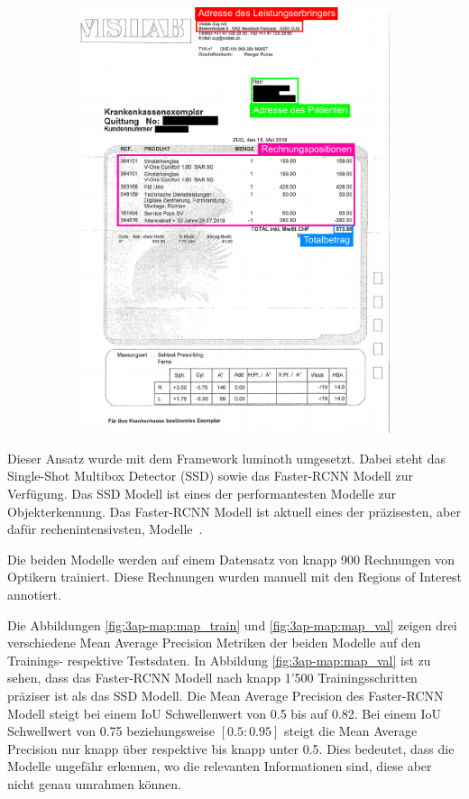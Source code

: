 \begin{figure}[H]
\begin{subfigure}[t]{0.5\linewidth}
    \includegraphics[scale=1]{graphics/roi-example-scan.pdf}
    \vspace{2ex}
  \end{subfigure}
\end{figure}

Dieser Ansatz wurde mit dem Framework luminoth umgesetzt. Dabei steht das Single-Shot Multibox Detector (SSD) sowie das Faster-RCNN Modell zur Verfügung. Das SSD Modell ist eines der performantesten Modelle zur Objekterkennung. Das Faster-RCNN Modell ist aktuell eines der präzisesten, aber dafür rechenintensivsten, Modelle~\autocite{SSDFRCNN}.

Die beiden Modelle werden auf einem Datensatz von knapp 900 Rechnungen von Optikern trainiert. Diese Rechnungen wurden manuell mit den Regions of Interest annotiert.

Die Abbildungen \ref{fig:3ap-map:map_train} und \ref{fig:3ap-map:map_val} zeigen drei verschiedene Mean Average Precision Metriken der beiden Modelle auf den Trainings- respektive Testsdaten. In Abbildung \ref{fig:3ap-map:map_val} ist zu sehen, dass das Faster-RCNN Modell nach knapp 1'500 Trainingsschritten präziser ist als das SSD Modell. Die Mean Average Precision des Faster-RCNN Modell steigt bei einem IoU Schwellenwert von 0.5 bis auf 0.82. Bei einem IoU Schwellwert von 0.75 beziehungsweise $[0.5:0.95]$ steigt die Mean Average Precision nur knapp über respektive bis knapp unter 0.5. Dies bedeutet, dass die Modelle ungefähr erkennen, wo die relevanten Informationen sind, diese aber nicht genau umrahmen können.

